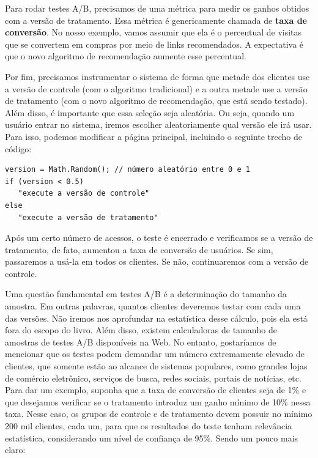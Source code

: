 \documentclass[
  11pt,
  twoside]{book}
\begin{document}
Para rodar testes A/B, precisamos de uma métrica para medir os ganhos
obtidos com a versão de tratamento. Essa métrica é genericamente chamada
de \textbf{taxa de conversão}. No nosso exemplo, vamos assumir que ela é
o percentual de visitas que se convertem em compras por meio de links
recomendados. A expectativa é que o novo algoritmo de recomendação
aumente esse percentual.

Por fim, precisamos instrumentar o sistema de forma que metade dos
clientes use a versão de controle (com o algoritmo tradicional) e a
outra metade use a versão de tratamento (com o novo algoritmo de
recomendação, que está sendo testado). Além disso, é importante que essa
seleção seja aleatória. Ou seja, quando um usuário entrar no sistema,
iremos escolher aleatoriamente qual versão ele irá usar. Para isso,
podemos modificar a página principal, incluindo o seguinte trecho de
código:

\begin{lstlisting}
version = Math.Random(); // número aleatório entre 0 e 1
if (version < 0.5)
   "execute a versão de controle"
else                                                 
   "execute a versão de tratamento"
\end{lstlisting}

Após um certo número de acessos, o teste é encerrado e verificamos se a
versão de tratamento, de fato, aumentou a taxa de conversão de usuários.
Se sim, passaremos a usá-la em todos os clientes. Se não, continuaremos
com a versão de controle.

Uma questão fundamental em testes A/B é a determinação do tamanho da
amostra. Em outras palavras, quantos clientes deveremos testar com cada
uma das versões. Não iremos nos aprofundar na estatística desse cálculo,
pois ela está fora do escopo do livro. Além disso, existem calculadoras
de tamanho de amostras de testes A/B disponíveis na Web. No entanto,
gostaríamos de mencionar que os testes podem demandar um número
extremamente elevado de clientes, que somente estão ao alcance de
sistemas populares, como grandes lojas de comércio eletrônico, serviços
de busca, redes sociais, portais de notícias, etc. Para dar um exemplo,
suponha que a taxa de conversão de clientes seja de 1\% e que desejamos
verificar se o tratamento introduz um ganho mínimo de 10\% nessa taxa.
Nesse caso, os grupos de controle e de tratamento devem possuir no
mínimo 200 mil clientes, cada um, para que os resultados do teste tenham
relevância estatística, considerando um nível de confiança de 95\%.
Sendo um pouco mais claro:
\end{document}
